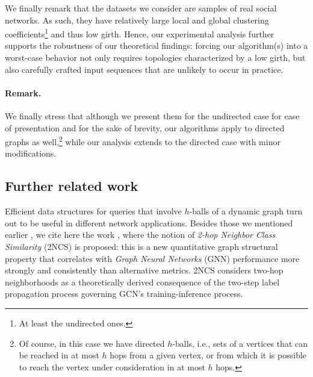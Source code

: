 We finally remark that the datasets we consider are samples of real social networks. As such, they have relatively large local and global clustering coefficients\footnote{At least the undirected ones.} and thus low girth. Hence, our experimental analysis further supports the robustness of our theoretical findings: forcing our algorithm(s) into a worst-case behavior not only requires topologies characterized by a low girth, but also carefully crafted input sequences that are unlikely to occur in practice.










\paragraph{Remark.}
We finally stress that although we present them for the undirected case for ease of presentation and for the sake of brevity, our algorithms apply to directed graphs as well,\footnote{Of course, in this case we have directed $h$-balls, i.e., sets of a vertices that can be reached in at most $h$ hops from a given vertex, or from which it is possible to reach the vertex under consideration in at most $h$ hops.} while our analysis extends to the directed case with minor modifications.

\subsection{Further related work}\label{subse:related}
Efficient data structures for queries that involve $h$-balls of a dynamic graph turn out to be useful in different network applications. Besides those we  mentioned earlier   \cite{becchetti2008link,zareie2020similarity,Sim-Nodes_Survey_2024}, we cite here the work \cite{cavallo20222}, where the notion of \textit{2-hop Neighbor Class Similarity} (2NCS) is proposed: this is  a new quantitative graph structural property that correlates with \textit{Graph Neural Networks} (GNN) \cite{scarselli2008graph,wu2022graph} performance more strongly and consistently than alternative metrics. 2NCS considers two-hop neighborhoods as a theoretically derived consequence of the two-step label propagation process governing GCN’s training-inference process.

